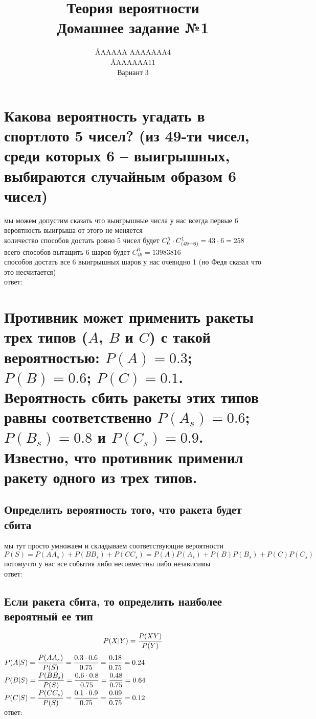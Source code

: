 \documentclass{article}
\title{Теория вероятности \\ Домашнее задание №1}
\author{\AA{AAAAA AAAAAAA}{4} \\ \AA{AAAAAA}{11} \\ Вариант 3}
\begin{document}
  \maketitle

  \section{Какова вероятность угадать в спортлото 5 чисел? (из 49-ти чисел, среди которых 6 -- выигрышных, выбираются случайным образом 6 чисел)}
  мы можем допустим сказать что выигрышные числа у нас всегда первые 6 \\
  вероятность выигрыша от этого не меняется \\
  количество способов достать ровно 5 чисел будет $C^5_6 \cdot C^1_{\left(49-6\right)} = 43 \cdot 6 = 258$ \\
  всего способов вытащить 6 шаров будет $C^6_{49} = 13983816$ \\
  способов достать все 6 выигрышных шаров у нас очевидно 1 (но Федя сказал что это несчитается) \\
  ответ: 


  \section{Противник может применить ракеты трех типов ($A$, $B$ и $C$) с такой вероятностью: $P(A) = 0.3$; $P(B) = 0.6$; $P(C) = 0.1$. Вероятность сбить ракеты этих типов равны соответственно $P(A_s) = 0.6$; $P(B_s) = 0.8$ и $P(C_s) = 0.9$. Известно, что противник применил ракету одного из трех типов.}

  \subsection{Определить вероятность того, что ракета будет сбита}
  мы тут просто умножаем и складываем соответствующие вероятности \\
  $P(S) = P(AA_s) + P(BB_s) + P(CC_s) = P(A)P(A_s) + P(B)P(B_s) + P(C)P(C_s)$ \\
  потомучто у нас все события либо несовместны либо независимы \\
  ответ: 

  \subsection{Если ракета сбита, то определить наиболее вероятный ее тип}
  $$ P(X|Y) = \frac{P(XY)}{P(Y)} $$
  $\displaystyle P(A|S) = \frac{P(AA_s)}{P(S)} = \frac{0.3 \cdot 0.6}{0.75} = \frac{0.18}{0.75} = 0.24$ \\
  $\displaystyle P(B|S) = \frac{P(BB_s)}{P(S)} = \frac{0.6 \cdot 0.8}{0.75} = \frac{0.48}{0.75} = 0.64$ \\
  $\displaystyle P(C|S) = \frac{P(CC_s)}{P(S)} = \frac{0.1 \cdot 0.9}{0.75} = \frac{0.09}{0.75} = 0.12$ \\
  ответ: 
\end{document}
